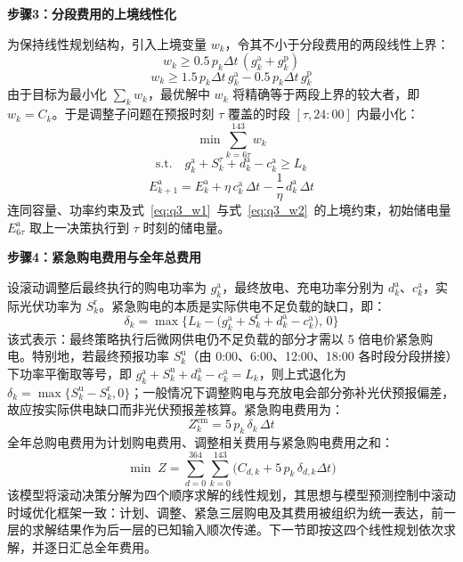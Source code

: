 \textbf{步骤3：分段费用的上境线性化}

为保持线性规划结构，引入上境变量 $w_k$，令其不小于分段费用的两段线性上界：
\begin{equation}
    w_k\geq 0.5\,p_k\Delta t\,(g^{\mathrm{a}}_k+g^{\mathrm{p}}_k)
    \label{eq:q3_w1}
\end{equation}
\begin{equation}
    w_k\geq 1.5\,p_k\Delta t\,g^{\mathrm{a}}_k-0.5\,p_k\Delta t\,g^{\mathrm{p}}_k
    \label{eq:q3_w2}
\end{equation}
由于目标为最小化 $\sum_k w_k$，最优解中 $w_k$ 将精确等于两段上界的较大者，即 $w_k=C_k$。于是调整子问题在预报时刻 $\tau$ 覆盖的时段 $[\tau,24:00]$ 内最小化：
\begin{equation}
    \min \sum_{k=6\tau}^{143} w_k
\end{equation}
\begin{equation}
    \mathrm{s.t.}\quad g^{\mathrm{a}}_k+S^{\tau}_k+d^{\mathrm{a}}_k-c^{\mathrm{a}}_k\geq L_k
\end{equation}
\begin{equation}
    E^{\mathrm{a}}_{k+1}=E^{\mathrm{a}}_k+\eta\,c^{\mathrm{a}}_k\,\Delta t-\frac{1}{\eta}\,d^{\mathrm{a}}_k\,\Delta t
\end{equation}
连同容量、功率约束及式~\eqref{eq:q3_w1}~与式~\eqref{eq:q3_w2}~的上境约束，初始储电量 $E^{\mathrm{a}}_{6\tau}$ 取上一决策执行到 $\tau$ 时刻的储电量。

\textbf{步骤4：紧急购电费用与全年总费用}

设滚动调整后最终执行的购电功率为 $g^{\mathrm{a}}_k$，最终放电、充电功率分别为 $d^{\mathrm{a}}_k$、$c^{\mathrm{a}}_k$，实际光伏功率为 $S^{\mathrm{r}}_k$。紧急购电的本质是实际供电不足负载的缺口，即：
\begin{equation}
    \delta_k=\max\Big\{L_k-\big(g^{\mathrm{a}}_k+S^{\mathrm{r}}_k+d^{\mathrm{a}}_k-c^{\mathrm{a}}_k\big),\,0\Big\}
\end{equation}
该式表示：最终策略执行后微网供电仍不足负载的部分才需以 5 倍电价紧急购电。特别地，若最终预报功率 $S^{\mathrm{u}}_k$（由 0:00、6:00、12:00、18:00 各时段分段拼接）下功率平衡取等号，即 $g^{\mathrm{a}}_k+S^{\mathrm{u}}_k+d^{\mathrm{a}}_k-c^{\mathrm{a}}_k=L_k$，则上式退化为 $\delta_k=\max\{S^{\mathrm{u}}_k-S^{\mathrm{r}}_k,0\}$；一般情况下调整购电与充放电会部分弥补光伏预报偏差，故应按实际供电缺口而非光伏预报差核算。紧急购电费用为：
\begin{equation}
    Z^{\mathrm{em}}_k=5\,p_k\,\delta_k\,\Delta t
\end{equation}
全年总购电费用为计划购电费用、调整相关费用与紧急购电费用之和：
\begin{equation}
    \min \; Z=\sum_{d=0}^{364}\sum_{k=0}^{143}\Big(C_{d,k}+5\,p_k\,\delta_{d,k}\Delta t\Big)
\end{equation}
该模型将滚动决策分解为四个顺序求解的线性规划，其思想与模型预测控制中滚动时域优化框架一致\cite{parisio2014}：计划、调整、紧急三层购电及其费用被组织为统一表达，前一层的求解结果作为后一层的已知输入顺次传递。下一节即按这四个线性规划依次求解，并逐日汇总全年费用。
